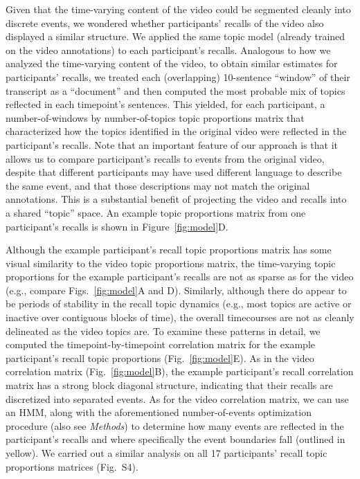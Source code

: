 \documentclass{article}
\newcommand{\corrmats}{S4}
\begin{document}
Given that the time-varying content of the video could be segmented cleanly into discrete events, we wondered whether participants' recalls of the video also displayed a similar structure.  We applied the same topic model (already trained on the video annotations) to each participant's recalls.  Analogous to how we analyzed the time-varying content of the video, to obtain similar estimates for participants' recalls, we treated each (overlapping) 10-sentence ``window'' of their transcript as a ``document'' and then computed the most probable mix of topics reflected in each timepoint's sentences.  This yielded, for each participant, a number-of-windows by number-of-topics topic proportions matrix that characterized how the topics identified in the original video were reflected in the participant's recalls.  Note that an important feature of our approach is that it allows us to compare participant's recalls to events from the original video, despite that different participants may have used different language to describe the same event, and that those descriptions may not match the original annotations.  This is a substantial benefit of projecting the video and recalls into a shared ``topic'' space.  An example topic proportions matrix from one participant's recalls is shown in Figure~\ref{fig:model}D.

Although the example participant's recall topic proportions matrix has some visual similarity to the video topic proportions matrix, the time-varying topic proportions for the example participant's recalls are not as sparse as for the video (e.g., compare Figs.~\ref{fig:model}A and D).  Similarly, although there do appear to be periods of stability in the recall topic dynamics (e.g., most topics are active or inactive over contiguous blocks of time), the overall timecourses are not as cleanly delineated as the video topics are.  To examine these patterns in detail, we computed the timepoint-by-timepoint correlation matrix for the example participant's recall topic proportions (Fig.~\ref{fig:model}E).  As in the video correlation matrix (Fig.~\ref{fig:model}B), the example participant's recall correlation matrix has a strong block diagonal structure, indicating that their recalls are discretized into separated events.  As for the video correlation matrix, we can use an HMM, along with the aforementioned number-of-events optimization procedure (also see \textit{Methods}) to determine how many events are reflected in the participant's recalls and where specifically the event boundaries fall (outlined in yellow).  We carried out a similar analysis on all 17 participants' recall topic proportions matrices (Fig.~\corrmats).
\end{document}
